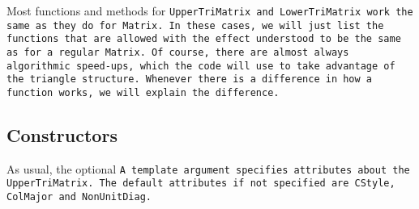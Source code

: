 Most functions and methods for \tt{UpperTriMatrix} and \tt{LowerTriMatrix}
work the same as they do for \tt{Matrix}.
In these cases, we will just list the functions that are allowed with the
effect understood to be the same as for a regular \tt{Matrix}.  Of course, there are 
almost always algorithmic speed-ups, which the code will use to take advantage of the 
triangle structure.
Whenever there is a difference in how a function works,
we will explain the difference.

\subsection{Constructors}
\label{TriMatrix_Constructors}

As usual, the optional \tt{A} template argument specifies attributes about
the \tt{UpperTriMatrix}.  The default attributes if not specified are
\tt{CStyle}, \tt{ColMajor} and \tt{NonUnitDiag}.

